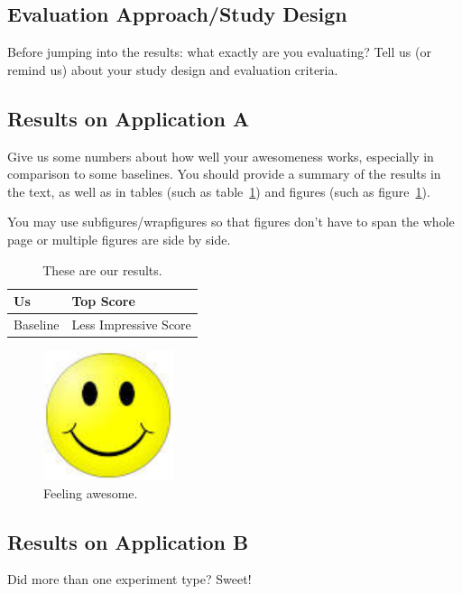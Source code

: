 \documentclass[twoside,11pt]{article}
\begin{document}
\subsection{Evaluation Approach/Study Design} 

Before jumping into the results: what exactly are you evaluating?
Tell us (or remind us) about your study design and evaluation
criteria.  

\subsection{Results on Application A} 

Give us some numbers about how well your awesomeness works, especially
in comparison to some baselines.  You should provide a summary of the
results in the text, as well as in tables (such as
table~\ref{tab:example}) and figures (such as figure~\ref{fig:example}).  

You may use subfigures/wrapfigures so that figures don't have to span
the whole page or multiple figures are side by side.

\begin{table}[htbp]
  \centering 
  \caption{These are our results.} 
  \begin{tabular}{|l|l|}\hline
    Us & Top Score \\ \hline
    Baseline & Less Impressive Score \\ \hline 
  \end{tabular}
  \label{tab:example} 
\end{table}

\begin{figure}[htbp]
  \centering 
  \includegraphics[width=1.5in]{smile.jpeg} 
  \caption{Feeling awesome.}
  \label{fig:example} 
\end{figure} 

\subsection{Results on Application B} 

Did more than one experiment type?  Sweet! 
\end{document}
